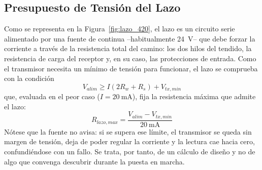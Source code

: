 \subsection{Presupuesto de Tensión del Lazo}\label{sub:presupuesto_lazo}

Como se representa en la Figura~\ref{fig:lazo_420}, el lazo es un circuito serie alimentado por una fuente de continua --habitualmente \SI{24}{\volt}-- que debe forzar la corriente a través de la resistencia total del camino: los dos hilos del tendido, la resistencia de carga del receptor y, en su caso, las protecciones de entrada. Como el transmisor necesita un mínimo de tensión para funcionar, el lazo se comprueba con la condición
\begin{equation}\label{eq:presupuesto_lazo}
    V_{alim} \ge I\left(2R_w + R_s\right) + V_{tx,min}
\end{equation}
que, evaluada en el peor caso ($I = \SI{20}{\milli\ampere}$), fija la resistencia máxima que admite el lazo:
\begin{equation}\label{eq:r_lazo_max}
    R_{lazo,max} = \frac{V_{alim} - V_{tx,min}}{\SI{20}{\milli\ampere}}
\end{equation}
Nótese que la fuente no avisa: si se supera ese límite, el transmisor se queda sin margen de tensión, deja de poder regular la corriente y la lectura cae hacia cero, confundiéndose con un fallo. Se trata, por tanto, de un cálculo de diseño y no de algo que convenga descubrir durante la puesta en marcha.

